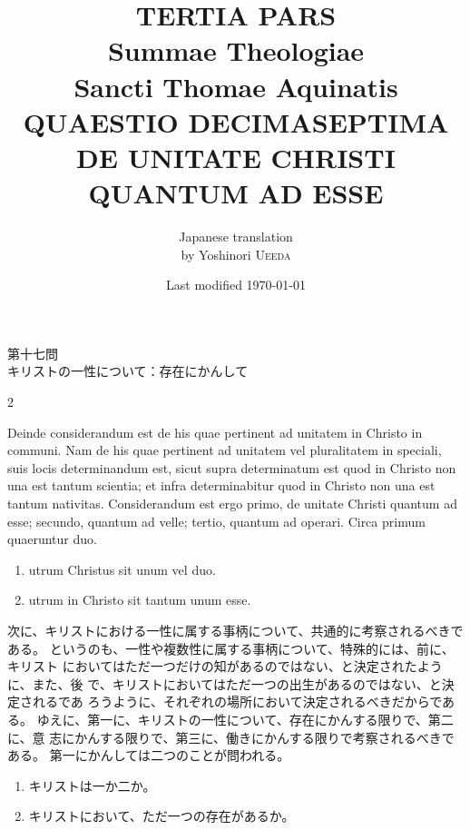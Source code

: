 \documentclass[paper=a4paper,fontsize=10pt,jafontsize=9pt,titlepage]{jlreq}
\title{{\bfseries TERTIA PARS}\\{\Huge Summae Theologiae}\\Sancti Thomae
Aquinatis\\{\sffamily QUAESTIO DECIMASEPTIMA}\\DE UNITATE CHRISTI QUANTUM AD ESSE}
\author{Japanese translation\\by Yoshinori {\scshape Ueeda}}
\date{Last modified \today}
\begin{document}
\maketitle
\pagestyle{fancy}

\begin{center}
{\Large 第十七問\\キリストの一性について：存在にかんして}
\end{center}

\begin{paracol}{2}

Deinde considerandum est de his quae pertinent ad unitatem in Christo in
 communi. Nam de his quae pertinent ad unitatem vel pluralitatem in
 speciali, suis locis determinandum est, sicut supra determinatum est
 quod in Christo non una est tantum scientia; et infra determinabitur
 quod in Christo non una est tantum nativitas. Considerandum est ergo
 primo, de unitate Christi quantum ad esse; secundo, quantum ad velle;
 tertio, quantum ad operari. Circa primum quaeruntur duo. 

\begin{enumerate}
 \item utrum Christus sit unum vel duo.
 \item utrum in Christo sit tantum unum esse.
\end{enumerate}

\switchcolumn

次に、キリストにおける一性に属する事柄について、共通的に考察されるべきで
 ある。
というのも、一性や複数性に属する事柄について、特殊的には、前に、キリスト
 においてはただ一つだけの知があるのではない、と決定されたように、また、後
 で、キリストにおいてはただ一つの出生があるのではない、と決定されるであ
 ろうように、それぞれの場所において決定されるべきだからである。
ゆえに、第一に、キリストの一性について、存在にかんする限りで、第二に、意
 志にかんする限りで、第三に、働きにかんする限りで考察されるべきである。
第一にかんしては二つのことが問われる。

\begin{enumerate}
 \item キリストは一か二か。
 \item キリストにおいて、ただ一つの存在があるか。
\end{enumerate}

\end{paracol}

\newpage
{}
{}
\setcounter{section}{1}
\setcounter{subsection}{0}
\end{document}
